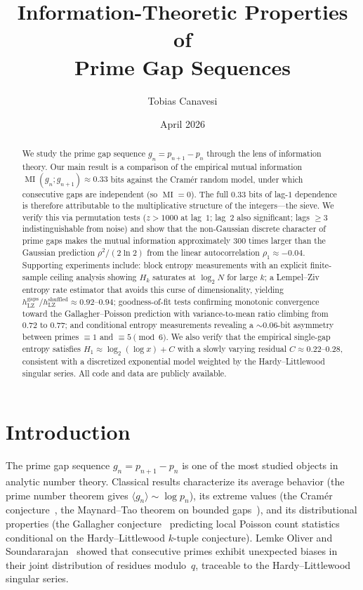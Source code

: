\documentclass[11pt, a4paper]{amsart}
\title[Information-Theoretic Properties of Prime Gap Sequences]{%
Information-Theoretic Properties of\\Prime Gap Sequences}
\author{Tobias Canavesi}
\date{April 2026}
\theoremstyle{plain}
\theoremstyle{definition}
\newcommand{\MI}{\operatorname{MI}}
\begin{document}
\begin{abstract}
We study the prime gap sequence $g_n = p_{n+1} - p_n$ through the lens of information theory.
Our main result is a comparison of the empirical mutual information $\MI(g_n; g_{n+1}) \approx 0.33$ bits
against the Cram\'er random model, under which consecutive gaps are independent (so $\MI = 0$).
The full $0.33$ bits of lag-$1$ dependence is therefore attributable to the multiplicative structure of the integers---the sieve.
We verify this via permutation tests ($z > 1000$ at lag~$1$; lag~$2$ also significant; lags $\ge 3$ indistinguishable from noise) and
show that the non-Gaussian discrete character of prime gaps makes the mutual information approximately $300$ times larger than
the Gaussian prediction $\rho^2/(2\ln 2)$ from the linear autocorrelation $\rho_1 \approx -0.04$.
Supporting experiments include:
block entropy measurements with an explicit finite-sample ceiling analysis showing $H_k$ saturates at $\log_2 N$ for large $k$;
a Lempel--Ziv entropy rate estimator that avoids this curse of dimensionality, yielding $h_{\mathrm{LZ}}^{\mathrm{gaps}}/h_{\mathrm{LZ}}^{\mathrm{shuffled}} \approx 0.92$--$0.94$;
goodness-of-fit tests confirming monotonic convergence toward the Gallagher--Poisson prediction with variance-to-mean ratio climbing from $0.72$ to $0.77$;
and conditional entropy measurements revealing a ${\sim}0.06$-bit asymmetry between primes $\equiv 1$ and $\equiv 5 \pmod{6}$.
We also verify that the empirical single-gap entropy satisfies $H_1 \approx \log_2(\log x) + C$ with a slowly varying residual $C \approx 0.22$--$0.28$,
consistent with a discretized exponential model weighted by the Hardy--Littlewood singular series.
All code and data are publicly available.
\end{abstract}

\maketitle
\tableofcontents

\section{Introduction}
\label{sec:intro}

The prime gap sequence $g_n = p_{n+1} - p_n$ is one of the most studied objects in analytic number theory. Classical results characterize its average behavior (the prime number theorem gives $\langle g_n \rangle \sim \log p_n$), its extreme values (the Cram\'er conjecture~\cite{Cramer1936}, the Maynard--Tao theorem on bounded gaps~\cite{Maynard2015}), and its distributional properties (the Gallagher conjecture~\cite{Gallagher1976} predicting local Poisson count statistics conditional on the Hardy--Littlewood $k$-tuple conjecture). Lemke Oliver and Soundararajan~\cite{LemkeOliver2016} showed that consecutive primes exhibit unexpected biases in their joint distribution of residues modulo~$q$, traceable to the Hardy--Littlewood singular series.
\end{document}
